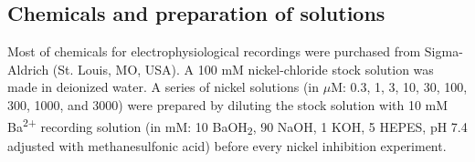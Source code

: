 \subsection*{Chemicals and preparation of solutions}

Most of chemicals for electrophysiological recordings were purchased from Sigma-Aldrich (St. Louis, MO, USA).
A 100 mM nickel-chloride stock solution was made in deionized water.
A series of nickel solutions (in $\mu$M: 0.3, 1, 3, 10, 30, 100, 300, 1000, and 3000) were prepared by diluting the stock solution with 10 mM Ba\textsuperscript{2+} recording solution (in mM: 10 BaOH\textsubscript{2}, 90 NaOH, 1 KOH, 5 HEPES, pH 7.4 adjusted with methanesulfonic acid) before every nickel inhibition experiment. 
